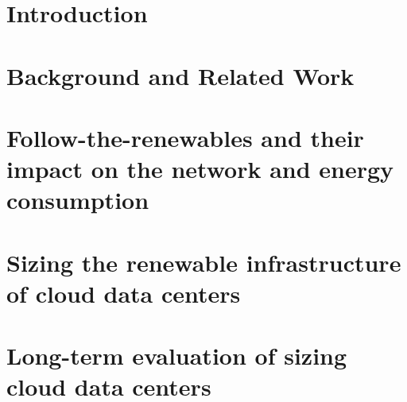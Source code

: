 
\chapter{Introduction} 
\label{chap:intro}





\chapter{Background and Related Work}
\label{chap:background}





\chapter[Follow-the-renewables and their impact on the  network and energy consumption]{Follow-the-renewables and their impact on the
  network and energy consumption}
\label{chap:smartgreens}





\chapter[Sizing the renewable infrastructure of cloud data centers]{Sizing the renewable infrastructure of cloud data centers}
\label{chap:ccgrid}







\chapter[Long-term  evaluation of sizing cloud data centers]{Long-term  evaluation of sizing cloud data centers}
\label{chap:ccgrid-extension}


